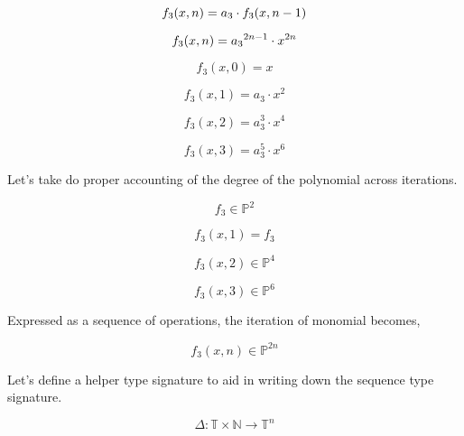 \documentclass[12pt]{article}
\begin{document}
\begin{equation}
    f_3(x,n) = a_3 \cdot f_3(x,n-1) \notag
\end{equation}

\begin{equation}
    f_3(x,n) = {a_3}^{2n - 1} \cdot x^{2n} \notag
\end{equation}

\begin{equation}
    f_3(x,0) = x
\end{equation}

\begin{equation}
    f_3(x,1) = a_3 \cdot x^2
\end{equation}

\begin{equation}
    f_3(x,2) = a_3^3 \cdot x^4
\end{equation}

\begin{equation}
    f_3(x,3) = a_3^5 \cdot x^6
\end{equation}

Let's take do proper accounting of the degree of the polynomial across
iterations.

\begin{equation}
    f_3 \in \mathbb{P}^2
\end{equation}

\begin{equation}
    f_3(x,1) = f_3
\end{equation}

\begin{equation}
    f_3(x,2) \in \mathbb{P}^4
\end{equation}

\begin{equation}
    f_3(x,3) \in \mathbb{P}^6
\end{equation}

Expressed as a sequence of operations, the iteration of monomial becomes,

\begin{equation}
    f_3(x,n) \in \mathbb{P}^{2n}
\end{equation}

Let's define a helper type signature to aid in writing down the sequence type
signature.

\begin{equation}
    \Delta: \mathbb{T} \times \mathbb{N} \rightarrow \mathbb{T}^n
\end{equation}
\end{document}
